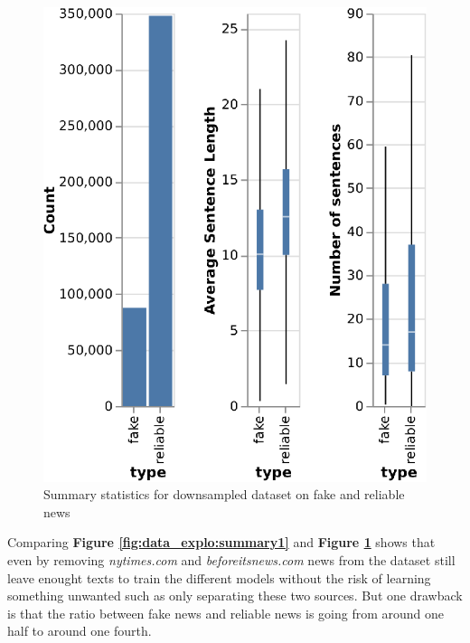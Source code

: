 \begin{figure}
	\centering
	\includegraphics{chapter/images/data_exploration/downsampled.eps}
	\caption{Summary statistics for downsampled dataset on fake and reliable news}
	\label{fig:data_explo:summary2}
\end{figure}

Comparing \textbf{Figure \ref{fig:data_explo:summary1}} and \textbf{Figure \ref{fig:data_explo:summary2}} shows that even by removing \textit{nytimes.com} and \textit{beforeitsnews.com} news from the dataset still leave enought texts to train the different models without the risk of learning something unwanted such as only separating these two sources. But one drawback is that the ratio between fake news and reliable news is going from around one half to around one fourth. 